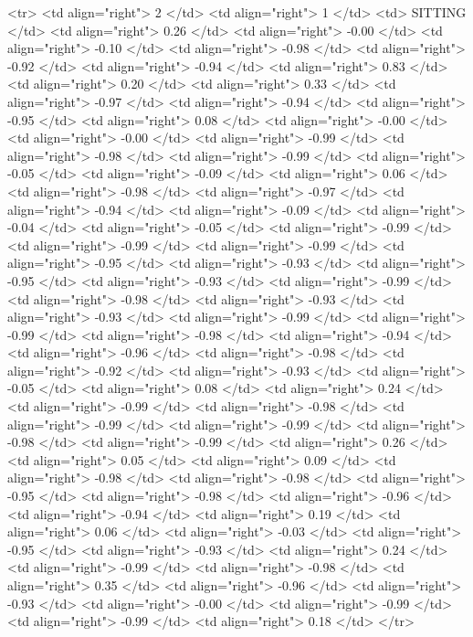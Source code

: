   <tr> <td align="right"> 2 </td> <td align="right">   1 </td> <td> SITTING </td> <td align="right"> 0.26 </td> <td align="right"> -0.00 </td> <td align="right"> -0.10 </td> <td align="right"> -0.98 </td> <td align="right"> -0.92 </td> <td align="right"> -0.94 </td> <td align="right"> 0.83 </td> <td align="right"> 0.20 </td> <td align="right"> 0.33 </td> <td align="right"> -0.97 </td> <td align="right"> -0.94 </td> <td align="right"> -0.95 </td> <td align="right"> 0.08 </td> <td align="right"> -0.00 </td> <td align="right"> -0.00 </td> <td align="right"> -0.99 </td> <td align="right"> -0.98 </td> <td align="right"> -0.99 </td> <td align="right"> -0.05 </td> <td align="right"> -0.09 </td> <td align="right"> 0.06 </td> <td align="right"> -0.98 </td> <td align="right"> -0.97 </td> <td align="right"> -0.94 </td> <td align="right"> -0.09 </td> <td align="right"> -0.04 </td> <td align="right"> -0.05 </td> <td align="right"> -0.99 </td> <td align="right"> -0.99 </td> <td align="right"> -0.99 </td> <td align="right"> -0.95 </td> <td align="right"> -0.93 </td> <td align="right"> -0.95 </td> <td align="right"> -0.93 </td> <td align="right"> -0.99 </td> <td align="right"> -0.98 </td> <td align="right"> -0.93 </td> <td align="right"> -0.93 </td> <td align="right"> -0.99 </td> <td align="right"> -0.99 </td> <td align="right"> -0.98 </td> <td align="right"> -0.94 </td> <td align="right"> -0.96 </td> <td align="right"> -0.98 </td> <td align="right"> -0.92 </td> <td align="right"> -0.93 </td> <td align="right"> -0.05 </td> <td align="right"> 0.08 </td> <td align="right"> 0.24 </td> <td align="right"> -0.99 </td> <td align="right"> -0.98 </td> <td align="right"> -0.99 </td> <td align="right"> -0.99 </td> <td align="right"> -0.98 </td> <td align="right"> -0.99 </td> <td align="right"> 0.26 </td> <td align="right"> 0.05 </td> <td align="right"> 0.09 </td> <td align="right"> -0.98 </td> <td align="right"> -0.98 </td> <td align="right"> -0.95 </td> <td align="right"> -0.98 </td> <td align="right"> -0.96 </td> <td align="right"> -0.94 </td> <td align="right"> 0.19 </td> <td align="right"> 0.06 </td> <td align="right"> -0.03 </td> <td align="right"> -0.95 </td> <td align="right"> -0.93 </td> <td align="right"> 0.24 </td> <td align="right"> -0.99 </td> <td align="right"> -0.98 </td> <td align="right"> 0.35 </td> <td align="right"> -0.96 </td> <td align="right"> -0.93 </td> <td align="right"> -0.00 </td> <td align="right"> -0.99 </td> <td align="right"> -0.99 </td> <td align="right"> 0.18 </td> </tr>
